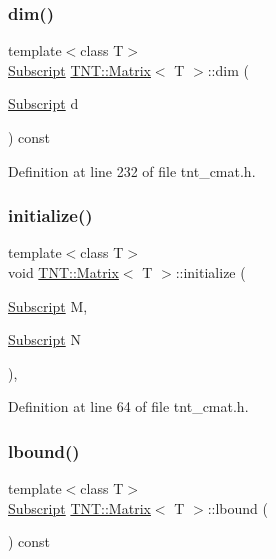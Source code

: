 \subsubsection{\texorpdfstring{dim()}{dim()}}
{\footnotesize\ttfamily template$<$class T$>$ \\
\hyperlink{namespaceTNT_af22e3f1460e145c04ce4e7d701e4c1c1}{Subscript} \hyperlink{classTNT_1_1Matrix}{T\+N\+T\+::\+Matrix}$<$ T $>$\+::dim (\begin{DoxyParamCaption}\item[{\hyperlink{namespaceTNT_af22e3f1460e145c04ce4e7d701e4c1c1}{Subscript}}]{d }\end{DoxyParamCaption}) const\hspace{0.3cm}{\ttfamily [inline]}}



Definition at line 232 of file tnt\+\_\+cmat.\+h.

\mbox{\label{classTNT_1_1Matrix_abc963d455626c3f0a170b2df8d40c39a}} 
\subsubsection{\texorpdfstring{initialize()}{initialize()}}
{\footnotesize\ttfamily template$<$class T$>$ \\
void \hyperlink{classTNT_1_1Matrix}{T\+N\+T\+::\+Matrix}$<$ T $>$\+::initialize (\begin{DoxyParamCaption}\item[{\hyperlink{namespaceTNT_af22e3f1460e145c04ce4e7d701e4c1c1}{Subscript}}]{M,  }\item[{\hyperlink{namespaceTNT_af22e3f1460e145c04ce4e7d701e4c1c1}{Subscript}}]{N }\end{DoxyParamCaption})\hspace{0.3cm}{\ttfamily [inline]}, {\ttfamily [protected]}}



Definition at line 64 of file tnt\+\_\+cmat.\+h.

\mbox{\label{classTNT_1_1Matrix_afb5b350bb3b5fa9980543908fb693235}} 
\subsubsection{\texorpdfstring{lbound()}{lbound()}}
{\footnotesize\ttfamily template$<$class T$>$ \\
\hyperlink{namespaceTNT_af22e3f1460e145c04ce4e7d701e4c1c1}{Subscript} \hyperlink{classTNT_1_1Matrix}{T\+N\+T\+::\+Matrix}$<$ T $>$\+::lbound (\begin{DoxyParamCaption}{ }\end{DoxyParamCaption}) const\hspace{0.3cm}{\ttfamily [inline]}}



